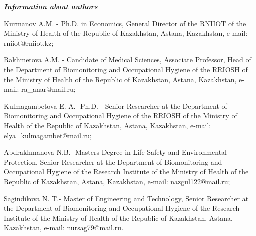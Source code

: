 \emph{{\bfseries Information about authors}}

\begin{noparindent}
Kurmanov A.M. - Ph.D. in Economics, General Director of the RNIIOT of
the Ministry of Health of the Republic of Kazakhstan, Astana,
Kazakhstan, e-mail: rniiot@rniiot.kz;

Rakhmetova A.M. - Candidate of Medical Sciences, Associate Professor,
Head of the Department of Biomonitoring and Occupational Hygiene of the
RRIOSH of the Ministry of Health of the Republic of Kazakhstan, Astana,
Kazakhstan, e-mail: ra\_anar@mail.ru;

Kulmagambetova E. A.- Ph.D. - Senior Researcher at the Department of
Biomonitoring and Occupational Hygiene of the RRIOSH of the Ministry of
Health of the Republic of Kazakhstan, Astana, Kazakhstan, e-mail:
elya\_kulmagambet@mail.ru;

Abdrakhmanova N.B.- Master\textquotesingle s Degree in Life Safety and
Environmental Protection, Senior Researcher at the Department of
Biomonitoring and Occupational Hygiene of the Research Institute of the
Ministry of Health of the Republic of Kazakhstan, Astana, Kazakhstan,
e-mail: nazgul122@mail.ru;

Sagindikova N. T.- Master of Engineering and Technology, Senior
Researcher at the Department of Biomonitoring and Occupational Hygiene
of the Research Institute of the Ministry of Health of the Republic of
Kazakhstan, Astana, Kazakhstan, e-mail: nursag79@mail.ru.
\end{noparindent}
